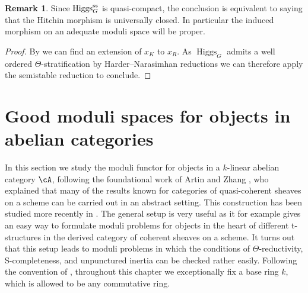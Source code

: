 \documentclass[a4paper]{amsart}
\numberwithin{equation}{section}
\theoremstyle{plain}
\theoremstyle{definition}
\newtheorem{remark}[thm]{Remark}
\renewcommand{\ss}{{\rm ss}}
\DeclareMathOperator{\Higgs}{Higgs}
\begin{document}
\begin{remark}
Since $\Higgs_G^{\ss}$ is quasi-compact, the conclusion is equivalent to saying that the Hitchin morphism is universally closed. In particular the induced morphism on an adequate moduli space will be proper. 
\end{remark}

\begin{proof}
	By  we can find an extension of $x_K$ to $x_R$. As $\Higgs_G$ admits a well ordered $\Theta$-stratification by Harder--Narasimhan reductions we can therefore apply the semistable reduction  to conclude.
\end{proof}	





\newcommand{\base}{k}

\section{Good moduli spaces for objects in abelian categories}

In this section we study the moduli functor for objects in a $k$-linear abelian category $\cA$, following the foundational work of Artin and Zhang \cite{artin-zhang}, who explained that many of the results known for categories of quasi-coherent sheaves on a scheme can be carried out in an abstract setting.  This construction has been studied more recently in \cite{gaitsgory2005notion, abramovich2006sheaves, calabrese2013moduli}. The general setup is very useful as it for example gives an easy way to formulate moduli problems for objects in the heart of different t-structures in the derived category of coherent sheaves on a scheme. It turns out that this setup leads to moduli problems in which the conditions of $\Theta$-reductivity,  {\textsf{S}}-completeness, and unpunctured inertia can be checked rather easily. Following the convention of \cite{artin-zhang}, throughout this chapter we exceptionally fix a base ring $k$, which is allowed to be any commutative ring.
\end{document}
